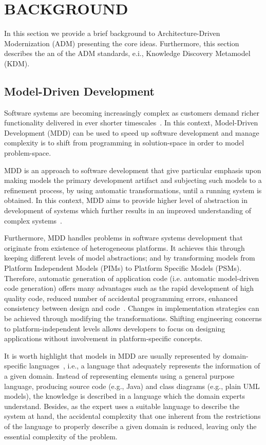 \documentclass[a4paper,twoside]{article}
\begin{document}
\section{\uppercase{Background}}

\noindent In this section we provide a brief background to Architecture-Driven Modernization (ADM) presenting the core ideas. Furthermore, this section describes the an of the ADM standards, e.i., Knowledge Discovery Metamodel (KDM).

\subsection{Model-Driven Development}

Software systems are becoming increasingly complex as customers demand richer functionality delivered in ever shorter timescales~\cite{550}. 
In this context, Model-Driven Development (MDD) can be used to speed up software development and manage complexity is to shift from programming in solution-space in order to model problem-space.

MDD is an approach to software development that give particular emphasis upon making models the primary development artifact and subjecting such models to a refinement process, by using automatic transformations, until a running system is obtained. In this context, MDD aims to provide higher level of abstraction in development of systems which further results in an improved understanding of complex systems~\cite{1296153}. 

Furthermore, MDD handles problems in software systems development that originate from existence of heterogeneous platforms. It achieves this through keeping different levels of model abstractions; and by transforming models from Platform Independent Models (PIMs) to Platform Specific Models (PSMs). Therefore, automatic  generation of application code (i.e. automatic model-driven code generation) offers many advantages such as the rapid development of high quality code, reduced number of accidental programming errors, enhanced consistency between design and code~\cite{Schmidt06_ModelDrivenEngineering}. Changes in implementation strategies can be achieved through modifying the transformations. Shifting engineering concerns to platform-independent levels allows developers to focus on designing applications without involvement in platform-specific concepts.

It is worth highlight that models in MDD are usually represented by domain-specific languages~\cite{Fowler:2010:DSL:1809745}, i.e., a language that adequately represents the information of a given domain. Instead of representing elements using a general purpose language, producing source code (e.g., Java) and class diagrams (e.g., plain UML models), the knowledge is described in a language which the domain experts understand. Besides, as the expert uses a suitable language to describe the system at hand, the accidental complexity that one inherent from the restrictions of the language to properly describe a given domain is reduced, leaving only the essential complexity of the problem. 
\end{document}
